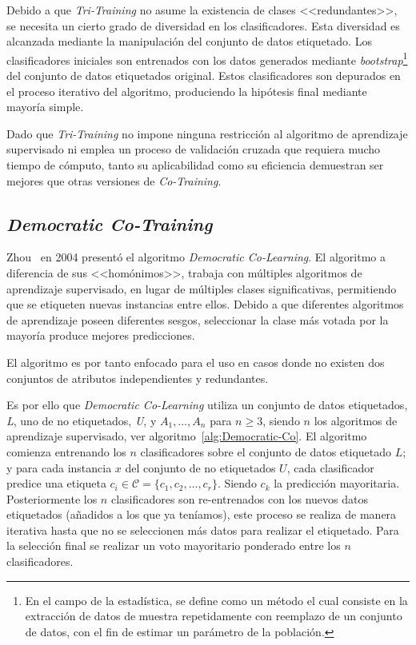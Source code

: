 Debido a que \textit{Tri-Training} no asume la existencia de clases <<redundantes>>, se necesita un cierto grado de diversidad en los clasificadores. Esta diversidad es alcanzada mediante la manipulación del conjunto de datos etiquetado. Los clasificadores iniciales son entrenados con los datos generados mediante \textit{bootstrap}\footnote{En el campo de la estadística, se define como un método el cual consiste en la extracción de datos de muestra repetidamente con reemplazo de un conjunto de datos, con el fin de estimar un parámetro de la población.} del conjunto de datos etiquetados original. Estos clasificadores son depurados en el proceso iterativo del algoritmo, produciendo la hipótesis final mediante mayoría simple.

Dado que \textit{Tri-Training} no impone ninguna restricción al algoritmo de aprendizaje supervisado ni emplea un proceso de validación cruzada que requiera mucho tiempo de cómputo, tanto su aplicabilidad como su eficiencia demuestran ser mejores que otras versiones de \textit{Co-Training}.

\subsection{\textit{Democratic Co-Training}}
Zhou~\cite{zhou2004democratic} en 2004 presentó el algoritmo \textit{Democratic Co-Learning}. El algoritmo a diferencia de sus <<homónimos>>, trabaja con múltiples algoritmos de aprendizaje supervisado, en lugar de múltiples clases significativas, permitiendo que se etiqueten nuevas instancias entre ellos. Debido a que diferentes algoritmos de aprendizaje poseen diferentes sesgos, seleccionar la clase más votada por la mayoría produce mejores predicciones.

El algoritmo es por tanto enfocado para el uso en casos donde no existen dos conjuntos de atributos independientes y redundantes.

Es por ello que \textit{Democratic Co-Learning} utiliza un conjunto de datos etiquetados, \textit{L}, uno de no etiquetados, \textit{U}, y $A_1,\dots ,A_n$ para $n \geq 3$, siendo $n$ los algoritmos de aprendizaje supervisado, ver algoritmo~\ref{alg:Democratic-Co}. El algoritmo comienza entrenando los $n$ clasificadores sobre el conjunto de datos etiquetado $L$; y para cada instancia $x$ del conjunto de no etiquetados $U$, cada clasificador predice una etiqueta $c_i \in \mathcal{C} = \lbrace c_1, c_2, \dots , c_r\rbrace$. Siendo $c_k$ la predicción mayoritaria. Posteriormente los $n$ clasificadores son re-entrenados con los nuevos datos etiquetados (añadidos a los que ya teníamos), este proceso se realiza de manera iterativa hasta que no se seleccionen más datos para realizar el etiquetado. Para la selección final se realizar un voto mayoritario ponderado entre los $n$ clasificadores. 

